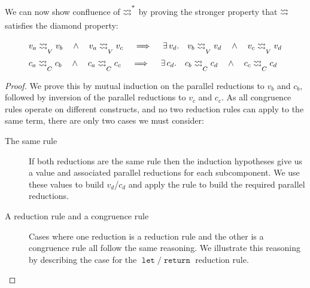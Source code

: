 \documentclass[acmsmall, screen, review, anonymous]{acmart}
\makeatletter
\theoremstyle{definition}
\newcommand{\returnname}{\mathop{\mathtt{return}}}
\newcommand{\letvname}{\mathop{\mathtt{let}}}
\newcommand{\drightsquigarrow}{\begin{array}{@{}c@{}}\rightsquigarrow \\[-8pt] \rightsquigarrow\end{array}}
\newcommand{\parastepstoname}{\drightsquigarrow}
\newcommand{\parastepstov}{\mathrel{\parastepstoname_{V}}}
\newcommand{\parastepstoc}{\mathrel{\parastepstoname_{C}}}
\newcommand{\parareducestoname}{\parastepstoname^{*}}
\makeatother
\begin{document}
We can now show confluence of $\parareducestoname$ by proving the
stronger property that $\parastepstoname$ satisfies the diamond
property:
\begin{lemma}
\label{lemma:parallel-reduction-diamond}
\begin{align*}
  &v_a \parastepstov v_b
    \quad \wedge \quad v_a \parastepstov v_c
    \quad \implies \quad \exists\, v_d. \quad v_b \parastepstov v_d
    \quad \wedge \quad v_c \parastepstov v_d \\
  &c_a \parastepstoc c_b
    \quad \wedge \quad c_a \parastepstoc c_c
    \quad \implies \quad \exists\, c_d. \quad c_b \parastepstoc c_d
    \quad \wedge \quad c_c \parastepstoc c_d
\end{align*}
\end{lemma}
\begin{proof}
  We prove this by mutual induction on the parallel reductions to $v_b$
  and $c_b$, followed by inversion of the parallel reductions to $v_c$
  and $c_c$. As all congruence rules operate on different constructs,
  and no two reduction rules can apply to the same term, there are only
  two cases we must consider:
\begin{description}
\item[The same rule] If both reductions are the same rule then the
  induction hypotheses give us a value and associated parallel
  reductions for each subcomponent. We use these values to build
  $v_d$/$c_d$ and apply the rule to build the required parallel
  reductions.
\item[A reduction rule and a congruence rule] Cases where
  one reduction is a reduction rule and the other is a congruence rule
  all follow the same reasoning. We illustrate this reasoning by
  describing the case for the $\letvname/\returnname$ reduction rule.


\end{description}
\end{proof}
\end{document}
